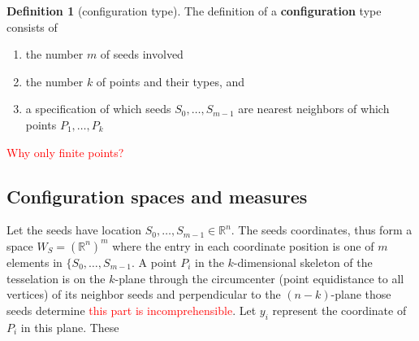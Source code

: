\documentclass{tufte-handout}
\theoremstyle{definition}
\newtheorem{defn}[thm]{Definition}
\theoremstyle{remark}
\begin{document}
\begin{defn}[configuration type]
	The definition of a \textbf{configuration} type consists of 
	\begin{enumerate}
		\item the number $m$ of seeds involved
		\item the number $k$ of points and their types, and 
		\item a specification of which seeds $S_0, \ldots, S_{m-1}$ are nearest neighbors of which points $P_1, \ldots,P_k$ 
	\end{enumerate}
	\textcolor{red}{Why only finite points?}	
\end{defn}

\subsection*{Configuration spaces and measures}

Let the seeds have location $S_0,\ldots,S_{m-1} \in \mathbb{R}^n$. The seeds coordinates, thus form a space $W_S = (\mathbb{R}^n)^m$ where the entry in each coordinate position is one of $m$ elements in $\{S_0, \ldots, S_{m-1}$. A point $P_i$ in the $k$-dimensional skeleton of the tesselation is on the $k$-plane through the circumcenter (point equidistance to all vertices) of its neighbor seeds and perpendicular to the $(n-k)$-plane those seeds determine  \textcolor{red}{this part is incomprehensible}.
	Let $y_i$ represent the coordinate of $P_i$ in this plane. These 
\end{document}
